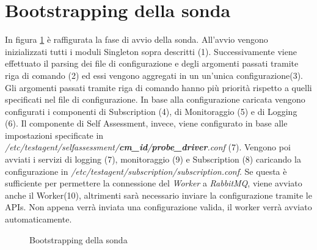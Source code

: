 \documentclass[../main.tex]{subfiles}
\begin{document}
\section{Bootstrapping della sonda}
In figura \ref{fig:TestAgent} è raffigurata la fase di avvio della sonda.
All'avvio vengono inizializzati tutti i moduli Singleton sopra descritti (1).
Successivamente viene effettuato il parsing dei file di configurazione e degli argomenti passati tramite riga di comando (2) ed essi vengono aggregati in un un'unica configurazione(3). Gli argomenti passati tramite riga di comando hanno più priorità rispetto a quelli specificati nel file di configurazione.
In base alla configurazione caricata vengono configurati i componenti di Subscription (4), di Monitoraggio (5) e di Logging (6).
Il componente di Self Assessment, invece, viene configurato in base alle impostazioni specificate in \textit{/etc/testagent/selfassessment/\textbf{cm\_id}/\textbf{\textit{probe\_driver}}.conf} (7).
Vengono poi avviati i servizi di logging (7), monitoraggio (9) e Subscription (8) caricando la configurazione in \textit{/etc/testagent/subscription/subscription.conf}. Se questa è sufficiente per permettere la connessione del \textit{Worker} a \textit{RabbitMQ}, viene avviato anche il Worker(10), altrimenti sarà necessario inviare la configurazione tramite le APIs. Non appena verrà inviata una configurazione valida, il worker verrà avviato automaticamente.
\begin{figure}[H]
\centering
{}
\caption{Bootstrapping della sonda}\label{fig:TestAgent}
\end{figure}
\end{document}
